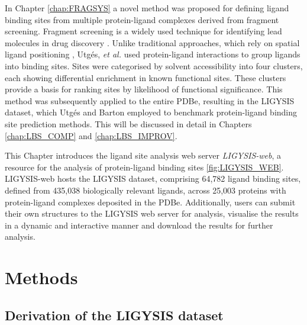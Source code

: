 In Chapter \ref{chap:FRAGSYS} a novel method was proposed for defining ligand binding sites from multiple protein-ligand complexes derived from fragment screening. Fragment screening is a widely used technique for identifying lead molecules in drug discovery \cite{CONGREVE_2003_RO3, REES_2004_FBLD, MURRAY_2009_FBDD}. Unlike traditional approaches, which rely on spatial ligand positioning \cite{SHIN_2005_PDBLIGAND, KOZAKOV_2005_CLUSTERING, WASS_2010_3DLIGANDSITE, MCGREIG_2022_3DLIGANDSITE}, Utgés, \textit{et al.} \cite{UTGES_2024_FRAGSYS} used protein-ligand interactions to group ligands into binding sites. Sites were categorised by solvent accessibility into four clusters, each showing differential enrichment in known functional sites. These clusters provide a basis for ranking sites by likelihood of functional significance. This method was subsequently applied to the entire PDBe, resulting in the LIGYSIS dataset, which Utgés and Barton \cite{UTGES_2024_LBSCOMP} employed to benchmark protein-ligand binding site prediction methods. This will be discussed in detail in Chapters \ref{chap:LBS_COMP} and \ref{chap:LBS_IMPROV}.

This Chapter introduces the ligand site analysis web server \textit{LIGYSIS-web}, a resource for the analysis of protein-ligand binding sites \autoref{fig:LIGYSIS_WEB}. LIGYSIS-web hosts the LIGYSIS dataset, comprising 64,782 ligand binding sites, defined from 435,038 biologically relevant ligands, across 25,003 proteins with protein-ligand complexes deposited in the PDBe. Additionally, users can submit their own structures to the LIGYSIS web server for analysis, visualise the results in a dynamic and interactive manner and download the results for further analysis.

\section{Methods}

\subsection{Derivation of the LIGYSIS dataset}

